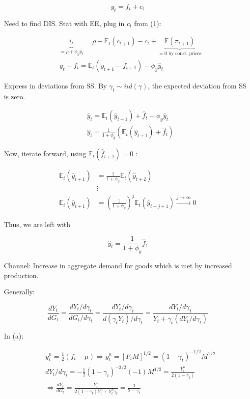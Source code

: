 {\begin{enumerate}[label=(\alph*)]
{\begin{equation*}
y_{t}=f_{t}+c_t \tag{1}
\end{equation*}

Need to find DIS. Stat with EE, plug in $c_t$ from (1):

$$
\begin{aligned}
& \underbrace{i_{t}}_{=\rho+\phi_{y}\hat{y}_t}=\rho+\mathbb{E}_{t}\left(c_{t+1}\right)-c_{t}+\underbrace{\mathbb{E}\left(\pi_{t+1}\right)}_{=0 \text{ by const. prices}} \\
& y_t-f_{t}=\mathbb{E}_{t}\left(y_{t+1}-f_{t+1}\right)-\phi_{y} \hat{y}_t
\end{aligned}
$$

Express in deviations from SS. By $\gamma_t \sim iid(\gamma)$, the expected deviation from SS is zero.

$$
\begin{aligned}
& \hat{y}_{t}=\mathbb{E}_{t}\left(\hat{y}_{t+1}\right)+\hat{f}_{t}-\phi_{y} \hat{y}_{t} \\
& \hat{y}_{t}=\frac{1}{1+\phi_{y}}\left(\mathbb{E}_{t}\left(\hat{y}_{t+1}\right)+\hat{f}_{t}\right)
\end{aligned}
$$

Now, iterate forward, using $\mathbb{E}_{t}\left(\hat{f}_{t+1}\right)=0$ :

$$
\begin{aligned}
    \mathbb{E}_{t} \left(\hat{y}_{t+1}\right) &= \frac{1}{1+\phi_{y}} \mathbb{E}_{t}\left(\hat{y}_{t+2}\right) \\
    &\vdots \\
    \mathbb{E}_{t}\left(\hat{y}_{t+1}\right) &= \left(\frac{1}{1+\phi_{y}}\right)^{j} \mathbb{E}_{t}\left(\hat{y}_{t+j+1}\right) \xrightarrow{j \rightarrow \infty} 0
\end{aligned}
$$

Thus, we are left with

$$
\hat{y}_{t}=\frac{1}{1+\phi_{y}} \hat{f}_{t}
$$

Channel: Increase in aggregate demand for goods which is met by increased production.
}
{
\item 
Generally:

$$
\frac{d Y_{t}}{d G_{t}}=\frac{d Y_{t} / d \gamma_{t}}{d G_{t} / d \gamma_{t}}=\frac{d Y_{t} / d \gamma_{t}}{d\left(\gamma_{t} Y_{t}\right) / d \gamma_{t}}=\frac{d Y_{t} / d \gamma_{t}}{Y_{t}+\gamma_{t} \left( d Y_{t} / d \gamma_{t}\right)}
$$

In (a):

$$
\begin{aligned}
& y_{t}^{n}=\frac{1}{2}\left(f_{t}-\mu\right) \Rightarrow y_{t}^{n}=\left[F_{t} M\right]^{1 / 2}=\left(1-\gamma_{t}\right)^{-1 / 2} M^{1 / 2} \\
& d Y_{t} / d \gamma_{t}=-\frac{1}{2}\left(1-\gamma_{t}\right)^{-3 / 2}(-1) M^{1 / 2}=\frac{Y_{t}^{n}}{2\left(1-\gamma_{t}\right)} \\
& \Rightarrow \frac{d Y_{t}}{d G_{t}}=\frac{Y_{t}^{n}}{2\left(1-\gamma_{t}\right) Y_{t}^{n}+Y_{t}^{n} \gamma_{t}}=\frac{1}{2-\gamma_{t}}
\end{aligned}
$$

}
\end{enumerate}}
